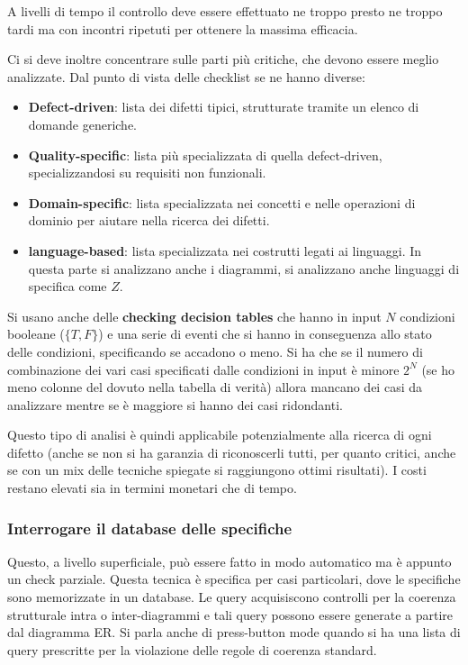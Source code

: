 A livelli di tempo il controllo deve essere effettuato ne troppo presto ne troppo
tardi ma con incontri ripetuti per ottenere la massima efficacia.

Ci si deve inoltre concentrare sulle parti più critiche, che devono essere meglio
analizzate. Dal punto di vista delle checklist se ne hanno diverse:
\begin{itemize}
      \item \textbf{Defect-driven}: lista dei difetti tipici, strutturate tramite
            un elenco di domande generiche.
      \item \textbf{Quality-specific}: lista più specializzata di quella
            defect-driven, specializzandosi su requisiti non funzionali.
      \item \textbf{Domain-specific}: lista specializzata nei concetti e nelle
            operazioni di dominio per aiutare nella ricerca dei difetti.
      \item \textbf{language-based}: lista specializzata nei costrutti legati ai
            linguaggi. In questa parte si analizzano anche i diagrammi, si
            analizzano anche linguaggi di specifica come $Z$.
\end{itemize}
Si usano anche delle \textbf{checking decision tables} che hanno in input $N$
condizioni booleane ($\{T, F\}$) e una serie di eventi che si hanno in conseguenza
allo stato delle condizioni, specificando se accadono o meno. Si ha che se il
numero di combinazione dei vari casi specificati dalle condizioni in input è minore
$2^N$ (se ho meno colonne del dovuto nella tabella di verità) allora mancano dei
casi da analizzare mentre se è maggiore si hanno dei casi ridondanti.

Questo tipo di analisi è quindi applicabile potenzialmente alla ricerca di ogni
difetto (anche se non si ha garanzia di riconoscerli tutti, per quanto critici,
anche se con un mix delle tecniche spiegate si raggiungono ottimi risultati).
I costi restano elevati sia in termini monetari che di tempo.
\subsubsection{Interrogare il database delle specifiche}
Questo, a livello superficiale, può essere fatto in modo automatico ma è appunto
un check parziale. Questa tecnica è specifica per casi particolari, dove le
specifiche sono memorizzate in un database. Le query acquisiscono controlli per
la coerenza strutturale intra o inter-diagrammi e tali query possono essere
generate a partire dal diagramma ER. Si parla anche di press-button mode quando
si ha una lista di query prescritte per la violazione delle regole di coerenza
standard.
